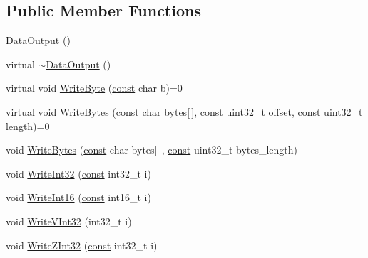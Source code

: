 \subsection*{Public Member Functions}
\begin{DoxyCompactItemize}
\item 
\mbox{\hyperlink{classlucene_1_1core_1_1store_1_1DataOutput_a0cc6c620951d12812df4f994309ba982}{Data\+Output}} ()
\item 
virtual \mbox{\hyperlink{classlucene_1_1core_1_1store_1_1DataOutput_a0b311a60a5a05bc511cd913a702f0390}{$\sim$\+Data\+Output}} ()
\item 
virtual void \mbox{\hyperlink{classlucene_1_1core_1_1store_1_1DataOutput_a22e242cc11ebfc3e7937eacb07106626}{Write\+Byte}} (\mbox{\hyperlink{ZlibCrc32_8h_a2c212835823e3c54a8ab6d95c652660e}{const}} char b)=0
\item 
virtual void \mbox{\hyperlink{classlucene_1_1core_1_1store_1_1DataOutput_ab2d4f729a14d87afd84ec558e11883d2}{Write\+Bytes}} (\mbox{\hyperlink{ZlibCrc32_8h_a2c212835823e3c54a8ab6d95c652660e}{const}} char bytes\mbox{[}$\,$\mbox{]}, \mbox{\hyperlink{ZlibCrc32_8h_a2c212835823e3c54a8ab6d95c652660e}{const}} uint32\+\_\+t offset, \mbox{\hyperlink{ZlibCrc32_8h_a2c212835823e3c54a8ab6d95c652660e}{const}} uint32\+\_\+t length)=0
\item 
void \mbox{\hyperlink{classlucene_1_1core_1_1store_1_1DataOutput_aee542a6d69d756f6ddaa4f1ea1db7fa4}{Write\+Bytes}} (\mbox{\hyperlink{ZlibCrc32_8h_a2c212835823e3c54a8ab6d95c652660e}{const}} char bytes\mbox{[}$\,$\mbox{]}, \mbox{\hyperlink{ZlibCrc32_8h_a2c212835823e3c54a8ab6d95c652660e}{const}} uint32\+\_\+t bytes\+\_\+length)
\item 
void \mbox{\hyperlink{classlucene_1_1core_1_1store_1_1DataOutput_a526e43529a56b9265797be87c5ecb150}{Write\+Int32}} (\mbox{\hyperlink{ZlibCrc32_8h_a2c212835823e3c54a8ab6d95c652660e}{const}} int32\+\_\+t i)
\item 
void \mbox{\hyperlink{classlucene_1_1core_1_1store_1_1DataOutput_ae1d2397af457949107f4f14a4cad969c}{Write\+Int16}} (\mbox{\hyperlink{ZlibCrc32_8h_a2c212835823e3c54a8ab6d95c652660e}{const}} int16\+\_\+t i)
\item 
void \mbox{\hyperlink{classlucene_1_1core_1_1store_1_1DataOutput_a5131f8ff1a41b0e11435515de2512483}{Write\+V\+Int32}} (int32\+\_\+t i)
\item 
void \mbox{\hyperlink{classlucene_1_1core_1_1store_1_1DataOutput_ac3a56b74f30cd1f61c7cd40d17830700}{Write\+Z\+Int32}} (\mbox{\hyperlink{ZlibCrc32_8h_a2c212835823e3c54a8ab6d95c652660e}{const}} int32\+\_\+t i)

\end{DoxyCompactItemize}
